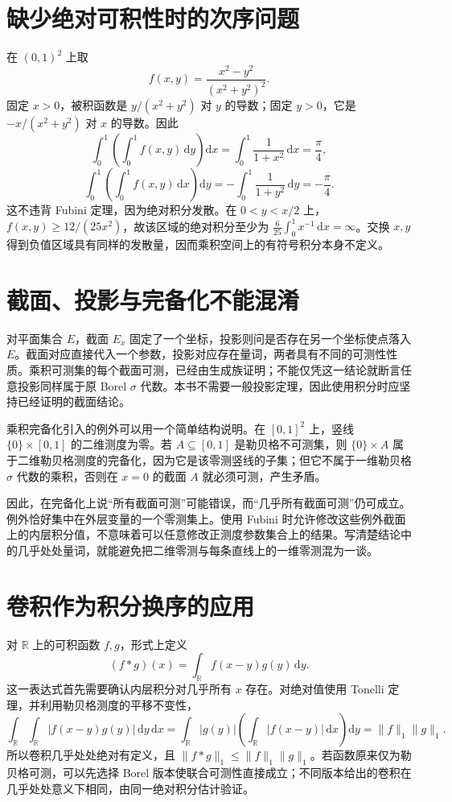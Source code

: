 \documentclass[UTF8,12pt,a4paper,fontset=fandol]{ctexbook}
\begin{document}
\section{缺少绝对可积性时的次序问题}
\begin{example}[两个迭代积分存在但不相等]
在 $(0,1)^2$ 上取
\[
 f(x,y)=\frac{x^2-y^2}{(x^2+y^2)^2}.
\]
固定 $x>0$，被积函数是 $y/(x^2+y^2)$ 对 $y$ 的导数；固定 $y>0$，它是 $-x/(x^2+y^2)$ 对 $x$ 的导数。因此
\[
 \int_0^1\left(\int_0^1 f(x,y)\,\mathrm dy\right)\mathrm dx
 =\int_0^1\frac{1}{1+x^2}\,\mathrm dx=\frac{\pi}{4},
\]
\[
 \int_0^1\left(\int_0^1 f(x,y)\,\mathrm dx\right)\mathrm dy
 =-\int_0^1\frac{1}{1+y^2}\,\mathrm dy=-\frac{\pi}{4}.
\]
这不违背 Fubini 定理，因为绝对积分发散。在 $0<y<x/2$ 上，
$f(x,y)\geq12/(25x^2)$，故该区域的绝对积分至少为
$\frac6{25}\int_0^1x^{-1}\,\mathrm dx=\infty$。交换 $x,y$ 得到负值区域具有同样的发散量，因而乘积空间上的有符号积分本身不定义。
\end{example}

\section{截面、投影与完备化不能混淆}
对平面集合 $E$，截面 $E_x$ 固定了一个坐标，投影则问是否存在另一个坐标使点落入 $E$。截面对应直接代入一个参数，投影对应存在量词，两者具有不同的可测性性质。乘积可测集的每个截面可测，已经由生成族证明；不能仅凭这一结论就断言任意投影同样属于原 Borel $\sigma$ 代数。本书不需要一般投影定理，因此使用积分时应坚持已经证明的截面结论。

乘积完备化引入的例外可以用一个简单结构说明。在 $[0,1]^2$ 上，竖线 $\{0\}\times[0,1]$ 的二维测度为零。若 $A\subseteq[0,1]$ 是勒贝格不可测集，则 $\{0\}\times A$ 属于二维勒贝格测度的完备化，因为它是该零测竖线的子集；但它不属于一维勒贝格 $\sigma$ 代数的乘积，否则在 $x=0$ 的截面 $A$ 就必须可测，产生矛盾。

因此，在完备化上说“所有截面可测”可能错误，而“几乎所有截面可测”仍可成立。例外恰好集中在外层变量的一个零测集上。使用 Fubini 时允许修改这些例外截面上的内层积分值，不意味着可以任意修改正测度参数集合上的结果。写清楚结论中的几乎处处量词，就能避免把二维零测与每条直线上的一维零测混为一谈。

\section{卷积作为积分换序的应用}
对 $\mathbb R$ 上的可积函数 $f,g$，形式上定义
\[
 (f*g)(x)=\int_{\mathbb R}f(x-y)g(y)\,\mathrm dy.
\]
这一表达式首先需要确认内层积分对几乎所有 $x$ 存在。对绝对值使用 Tonelli 定理，并利用勒贝格测度的平移不变性，
\[
 \int_{\mathbb R}\int_{\mathbb R}|f(x-y)g(y)|\,\mathrm dy\,\mathrm dx
 =\int_{\mathbb R}|g(y)|\left(\int_{\mathbb R}|f(x-y)|\,\mathrm dx\right)\mathrm dy
 =\|f\|_1\|g\|_1.
\]
所以卷积几乎处处绝对有定义，且 $\|f*g\|_1\leq\|f\|_1\|g\|_1$。若函数原来仅为勒贝格可测，可以先选择 Borel 版本使联合可测性直接成立；不同版本给出的卷积在几乎处处意义下相同，由同一绝对积分估计验证。
\end{document}

